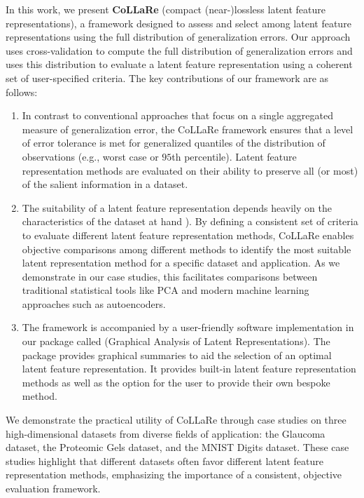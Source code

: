 In this work, we present \textbf{CoLLaRe} (compact (near-)lossless latent feature representations), a framework designed to assess and select among latent feature representations using the full distribution of generalization errors.
Our approach uses cross-validation to compute the full distribution of generalization errors and uses this distribution to evaluate a latent feature representation using a coherent set of user-specified criteria.
The key contributions of our framework are as follows:
\begin{enumerate}
    \item In contrast to conventional approaches that focus on a single aggregated measure of generalization error, the CoLLaRe framework ensures that a level of error tolerance is met for generalized quantiles of the distribution of observations (e.g., worst case or $95$th percentile). Latent feature representation methods are evaluated on their ability to preserve all (or most) of the salient information in a dataset.
    \item The suitability of a latent feature representation depends heavily on the characteristics of the dataset at hand \parencite[Section 3, pp. 325--328]{morris_functional_2015}).
    By defining a consistent set of criteria to evaluate different latent feature representation methods, CoLLaRe enables objective comparisons among different methods to identify the most suitable latent representation method for a specific dataset and application.
    As we demonstrate in our case studies, this facilitates comparisons between traditional statistical tools like PCA and modern machine learning approaches such as autoencoders.
    \item The framework is accompanied by a user-friendly software implementation in our  package called  (Graphical Analysis of Latent Representations).
    The package provides graphical summaries to aid the selection of an optimal latent feature representation.
    It provides built-in latent feature representation methods as well as the option for the user to provide their own bespoke method.
\end{enumerate}
We demonstrate the practical utility of CoLLaRe through case studies on three high-dimensional datasets from diverse fields of application: the Glaucoma dataset, the Proteomic Gels dataset, and the MNIST Digits dataset.
These case studies highlight that different datasets often favor different latent feature representation methods, emphasizing the importance of a consistent, objective evaluation framework.


